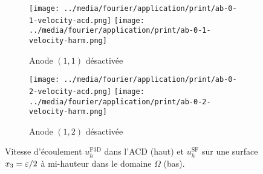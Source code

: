 \begin{figure}[h]
  \begin{center}
    \begin{subfigure}[t]{\textwidth}
      \begin{center}
        \texttt{[image: ../media/fourier/application/print/ab-0-1-velocity-acd.png]}
        \texttt{[image: ../media/fourier/application/print/ab-0-1-velocity-harm.png]}
        \caption{Anode $(1,1)$ désactivée}
        \label{fig:}
      \end{center}
    \end{subfigure}

    \begin{subfigure}[t]{\textwidth}
      \begin{center}
        \texttt{[image: ../media/fourier/application/print/ab-0-2-velocity-acd.png]}
        \texttt{[image: ../media/fourier/application/print/ab-0-2-velocity-harm.png]}
        \caption{Anode $(1,2)$ désactivée}
        \label{fig:}
      \end{center}
    \end{subfigure}


    \caption{Vitesse d'écoulement $u_h^\mathrm{F3D}$ dans l'ACD (haut) et $u_h^\mathrm{SF}$ sur une surface
      $x_3 = \varepsilon / 2$ à mi-hauteur dans le domaine $\Omega$ (bas).}
    \label{fig:harmonic-velocity-comp}
  \end{center}
\end{figure}


